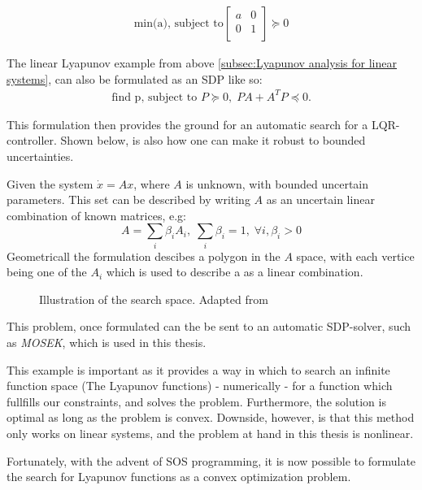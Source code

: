 \begin{align*}
  \text{min(a), subject to}
  \begin{bmatrix}
    a & 0 \\
    0 & 1 \\
  \end{bmatrix}
  \succeq 0
\end{align*}\cite{tedrakeUnderactuatedRoboticsAlgorithms2019}

The linear Lyapunov example from above \ref{subsec:Lyapunov analysis for linear
  systems}, can also be formulated as an \ac{SDP} like so:
\begin{align*}
  \text{find p, subject to } P \succeq 0, \; PA + A^TP \preceq 0.
\end{align*}\cite{tedrakeUnderactuatedRoboticsAlgorithms2019}

This formulation then provides the ground for an automatic search for a
\ac{LQR}-controller. Shown below, is also how one can make it robust to bounded
uncertainties.

Given the system \(\dot{x} = Ax\), where \(A\) is unknown, with bounded
uncertain parameters. This set can be described by writing \(A\) as an uncertain
linear combination of known matrices, e.g:
\[
  A = \sum_{i} \beta_{i}A_{i}, \; \sum_{i}\beta_{i} = 1, \; \forall i,\beta_{i}
  > 0
\]
Geometricall the formulation descibes a polygon in the \(A\) space, with each
vertice being one of the \(A_{i}\) which is used to describe a as a linear
combination.

\begin{figure}
  
  \caption{Illustration of the search space. Adapted from
    \cite{tedrakeUnderactuatedRoboticsAlgorithms2019}}
\end{figure}


This problem, once formulated can the be sent to an automatic \ac{SDP}-solver,
such as \textit{MOSEK}\cite{mosek}, which is used in this thesis.

This example is important as it provides a way in which to search an infinite
function space (The Lyapunov functions) - numerically - for a function which
fullfills our constraints, and solves the problem. Furthermore, the solution is
optimal as long as the problem is convex. Downside, however, is that this method
only works on linear systems, and the problem at hand in this thesis is
nonlinear.

Fortunately, with the advent of \ac{SOS} programming, it is now possible to
formulate the search for Lyapunov functions as a convex optimization problem.

